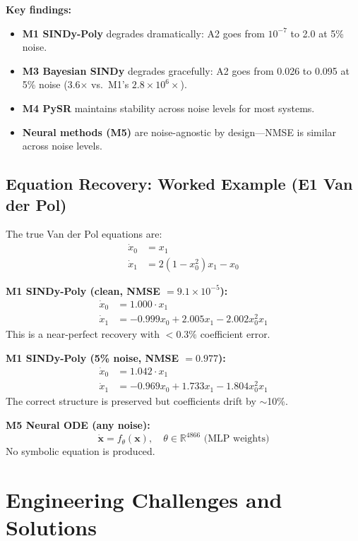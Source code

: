 \documentclass[conference]{IEEEtran}
\begin{document}
\textbf{Key findings:}
\begin{itemize}
    \item \textbf{M1 SINDy-Poly} degrades dramatically: A2 goes from $10^{-7}$ to 2.0 at 5\% noise.
    \item \textbf{M3 Bayesian SINDy} degrades gracefully: A2 goes from 0.026 to 0.095 at 5\% noise (3.6$\times$ vs.\ M1's $2.8\times10^6\times$).
    \item \textbf{M4 PySR} maintains stability across noise levels for most systems.
    \item \textbf{Neural methods (M5)} are noise-agnostic by design---NMSE is similar across noise levels.
\end{itemize}

\subsection{Equation Recovery: Worked Example (E1 Van der Pol)}

The true Van der Pol equations are:
\begin{align}
\dot{x}_0 &= x_1 \\
\dot{x}_1 &= 2(1 - x_0^2) x_1 - x_0
\end{align}

\textbf{M1 SINDy-Poly (clean, NMSE $= 9.1 \times 10^{-5}$):}
\begin{align}
\dot{x}_0 &= 1.000 \cdot x_1 \\
\dot{x}_1 &= -0.999 x_0 + 2.005 x_1 - 2.002 x_0^2 x_1
\end{align}
This is a near-perfect recovery with $<0.3\%$ coefficient error.

\textbf{M1 SINDy-Poly (5\% noise, NMSE $= 0.977$):}
\begin{align}
\dot{x}_0 &= 1.042 \cdot x_1 \\
\dot{x}_1 &= -0.969 x_0 + 1.733 x_1 - 1.804 x_0^2 x_1
\end{align}
The correct structure is preserved but coefficients drift by $\sim$10\%.

\textbf{M5 Neural ODE (any noise):}
\begin{equation}
\dot{\mathbf{x}} = f_\theta(\mathbf{x}), \quad \theta \in \mathbb{R}^{4866} \text{ (MLP weights)}
\end{equation}
No symbolic equation is produced.

\section{Engineering Challenges and Solutions}
\label{sec:engineering}
\end{document}
